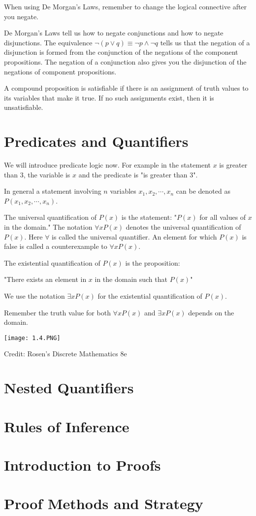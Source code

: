 \documentclass[../discrete.tex]{subfiles}
\begin{document}
When using De Morgan's Laws, remember to change the logical connective after you negate. 

De Morgan's Laws tell us how to negate conjunctions and how to negate disjunctions. The equivalence $\neg(p\lor q)\equiv \neg p \land \neg q$ tells us that the negation of a disjunction is formed from the conjunction of the negations of the component propositions. The negation of a conjunction also gives you the disjunction of the negations of component propositions.

A compound proposition is satisfiable if there is an assignment of truth values to its variables that make it true. If no such assignments exist, then it is unsatisfiable. 
\section{Predicates and Quantifiers}
We will introduce predicate logic now. For example in the statement $x$ is greater than 3, the variable is $x$ and the predicate is "is greater than 3".

In general a statement involving $n$ variables $x_1,x_2,\cdots,x_n$ can be denoted as $P(x_1,x_2,\cdots,x_n)$. 

\begin{definition}
    The universal quantification of $P(x)$ is the statement:
    \smallbreak
    "$P(x)$ for all values of $x$ in the domain."
    \smallbreak
    The notation $\forall x P(x)$ denotes the universal quantification of $P(x)$. Here $\forall$ is called the universal quantifier. An element for which $P(x)$ is false is called a counterexample to $\forall x P(x)$.
\end{definition}
\begin{definition}
    The existential quantification of $P(x)$ is the proposition:

    "There exists an element in $x$ in the domain such that $P(x)$"

    We use the notation $\exists x P(x)$ for the existential quantification of $P(x)$.
\end{definition}
Remember the truth value for both $\forall x P(x)$ and $\exists x P(x)$ depends on the domain.
\begin{center}
    \texttt{[image: 1.4.PNG]}
\end{center}
Credit: Rosen's Discrete Mathematics 8e

\section{Nested Quantifiers}
\section{Rules of Inference}
\section{Introduction to Proofs}
\section{Proof Methods and Strategy}
\end{document}
